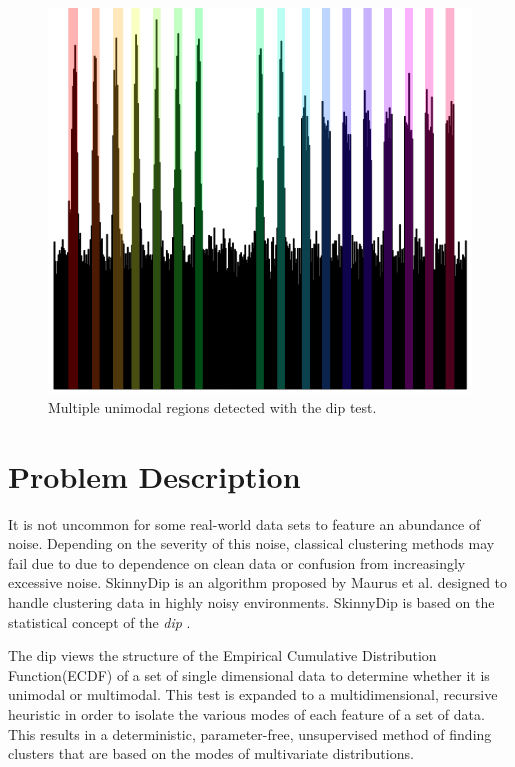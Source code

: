 \documentclass{sig-alternate-05-2015}
\begin{document}
\begin{figure}[t]
\centering
\includegraphics[width=\columnwidth]{images/unimodes}
\caption{Multiple unimodal regions detected with the dip test.}
\label{fig:skinnystripes}
\end{figure}






\section{Problem Description}
It is not uncommon for some real-world data sets to feature an abundance of noise. Depending on the severity of this noise, classical clustering methods may fail due to due to dependence on clean data or confusion from increasingly excessive noise. SkinnyDip is an algorithm proposed by Maurus et al.\cite{skinnydip} designed to handle clustering data in highly noisy environments. SkinnyDip is based on the statistical concept of the \textit{dip} \cite{dip}. 

The dip views the structure of the Empirical Cumulative Distribution Function(ECDF) of a set of single dimensional data to determine whether it is unimodal or multimodal. This test is expanded to a multidimensional, recursive heuristic in order to isolate the various modes of each feature of a set of data. This results in a deterministic, parameter-free, unsupervised method of finding clusters that are based on the modes of multivariate distributions. 
\end{document}
